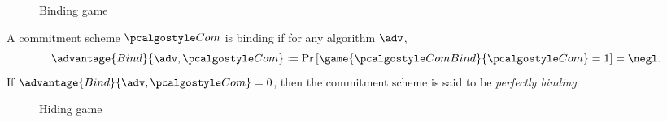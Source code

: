 \begin{figure}[tbhp]
  \begin{center}
    \begin{tcolorbox}[width=8cm]
      \begin{pchstack}[center]
      \end{pchstack}
    \end{tcolorbox}
  \end{center}
  \caption{Binding game \label{fig:break-com-bind}}
\end{figure}

\begin{definition}[Binding]
  A commitment scheme $\algo{Com}$ is binding if for any \ppt algorithm $\adv$,
 \[
  \advantage{Bind}{\adv, \algo{Com}} \defeq \pr{\game{\algo{ComBind}}{\algo{Com}} = 1} = \negl.
 \]
 If $\advantage{Bind}{\adv, \algo{Com}} = 0$, then the commitment scheme is said to be \emph{perfectly binding}.
\end{definition}

\begin{figure}[tbhp]
  \begin{center}
    \begin{tcolorbox}[width=8cm]
      \begin{pchstack}[center]
      \end{pchstack}
    \end{tcolorbox}
  \end{center}
  \caption{Hiding game \label{fig:break-com-hid}}
\end{figure}

